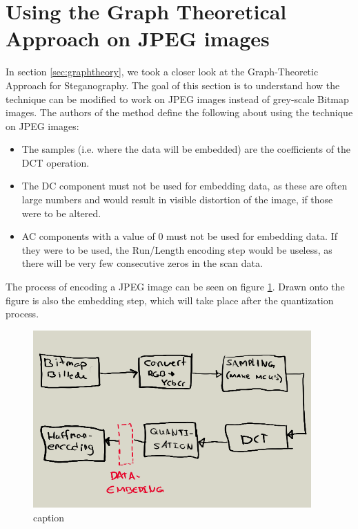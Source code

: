 \section{Using the Graph Theoretical Approach on JPEG images}
\label{sec:graphJPEG}
In section \ref{sec:graphtheory}, we took a closer look at the Graph-Theoretic Approach for Steganography. 
The goal of this section is to understand how the technique can be modified to work on JPEG images instead of grey-scale Bitmap images. 
The authors of the method define the following about using the technique on JPEG images\citep{hetzl_2005}:

\begin{itemize}
	\item The samples (i.e. 
	where the data will be embedded) are the coefficients of the DCT operation. 
	\item The DC component must not be used for embedding data, as these are often large numbers and would result in visible distortion of the image, if those were to be altered.
	\item AC components with a value of 0 must not be used for embedding data. 
	If they were to be used, the Run/Length encoding step would be useless, as there will be very few consecutive zeros in the scan data.
\end{itemize}

The process of encoding a JPEG image can be seen on figure \ref{fig:JPEGprocess}. 
Drawn onto the figure is also the embedding step, which will take place after the quantization process.

\begin{figure}[h!]
	\centering
	\includegraphics[width=0.95\textwidth]{figures/JPEGprocess.png}
	\caption{caption}
	\label{fig:JPEGprocess}
\end{figure}

